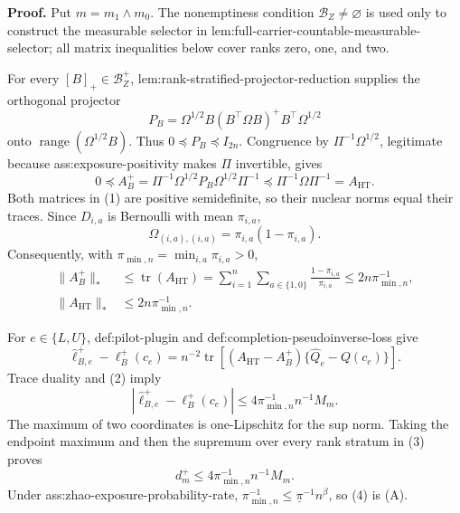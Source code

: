 \textbf{Proof.}
Put \(m=m_1\wedge m_0\).  The nonemptiness condition \(\mathcal B_Z\ne\varnothing\) is used only to construct the measurable selector in lem:full-carrier-countable-measurable-selector; all matrix inequalities below cover ranks zero, one, and two.

For every \([B]_+\in\mathcal B_Z^+\), lem:rank-stratified-projector-reduction supplies the orthogonal projector
\[
 P_B=\Omega^{1/2}B(B^{\top}\Omega B)^+B^{\top}\Omega^{1/2}
\]
onto \(\operatorname{range}(\Omega^{1/2}B)\).  Thus \(0\preceq P_B\preceq I_{2n}\).  Congruence by \(\Pi^{-1}\Omega^{1/2}\), legitimate because ass:exposure-positivity makes \(\Pi\) invertible, gives
\[
0\preceq
A_B^+=\Pi^{-1}\Omega^{1/2}P_B\Omega^{1/2}\Pi^{-1}
\preceq
\Pi^{-1}\Omega\Pi^{-1}=A_{\mathrm{HT}}.
\tag{1}
\]
Both matrices in (1) are positive semidefinite, so their nuclear norms equal their traces.  Since \(D_{i,a}\) is Bernoulli with mean \(\pi_{i,a}\),
\[
 \Omega_{(i,a),(i,a)}=\pi_{i,a}(1-\pi_{i,a}).
\]
Consequently, with \(\pi_{\min,n}=\min_{i,a}\pi_{i,a}>0\),
\[
\begin{aligned}
\lVert A_B^+\rVert_*
&\le \operatorname{tr}(A_{\mathrm{HT}})
=\sum_{i=1}^n\sum_{a\in\{1,0\}}
\frac{1-\pi_{i,a}}{\pi_{i,a}}
\le2n\pi_{\min,n}^{-1},\\
\lVert A_{\mathrm{HT}}\rVert_*
&\le2n\pi_{\min,n}^{-1}.
\end{aligned}
\tag{2}
\]

For \(e\in\{L,U\}\), def:pilot-plugin and def:completion-pseudoinverse-loss give
\[
 \widehat\ell_{B,e}^+-\ell_B^+(c_e)
 =n^{-2}\operatorname{tr}\!\left[
 (A_{\mathrm{HT}}-A_B^+)\{\widehat Q_e-Q(c_e)\}
 \right].
\]
Trace duality and (2) imply
\[
 \left|\widehat\ell_{B,e}^+-\ell_B^+(c_e)\right|
 \le4\pi_{\min,n}^{-1}n^{-1}M_m.
\tag{3}
\]
The maximum of two coordinates is one-Lipschitz for the sup norm.  Taking the endpoint maximum and then the supremum over every rank stratum in (3) proves
\[
 d_m^+\le4\pi_{\min,n}^{-1}n^{-1}M_m.
\tag{4}
\]
Under ass:zhao-exposure-probability-rate,
\(\pi_{\min,n}^{-1}\le\underline\pi^{-1}n^{\beta}\), so (4) is (A).

